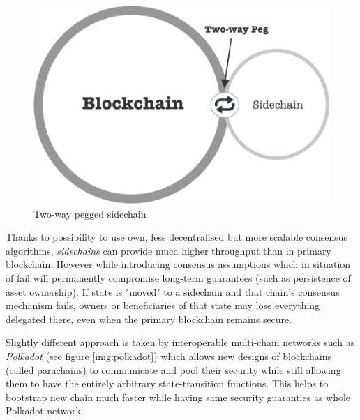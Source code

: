 \documentclass[a4paper,12pt]{article}
\begin{document}
\begin{figure}[H]
    \centering
    \includegraphics[scale=0.5]{img/sidechain}
    \caption{Two-way pegged sidechain}
    \label{img:sidechain}
\end{figure}

Thanks to possibility to use own, less decentralised but more scalable consensus
algorithms, \textit{sidechains} can provide much higher throughput than in 
primary blockchain. However while introducing consensus assumptions which in 
situation of fail will permanently compromise long-term guarantees (such as 
persistence of asset ownership). If state is "moved" to a sidechain and that 
chain's consensus mechanism fails, owners or beneficiaries of that state may 
lose everything delegated there, even when the primary blockchain remains
secure.

Slightly different approach is taken by interoperable multi-chain networks such 
as \textit{Polkadot} (see figure \ref{img:polkadot}) which allows new designs of
blockchains (called parachains) to communicate and pool their security while 
still allowing them to have the entirely arbitrary state-transition functions. 
This helps to bootstrap new chain much faster while having same security 
guaranties as whole Polkadot network.
\end{document}
